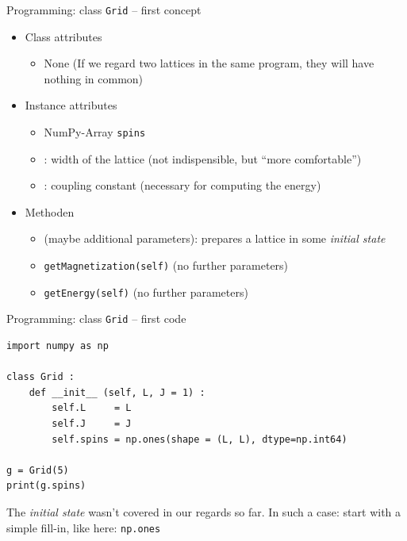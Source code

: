 
\begin{frame}[fragile]{Programming: class \texttt{Grid} -- first concept}
%
\begin{tcolorbox}[title=class \texttt{Grid}]
\begin{itemize}
\item Class attributes
	\begin{itemize}
	\item None (If we regard two lattices in the same program, they will have nothing in common)
	\end{itemize}
\item Instance attributes
	\begin{itemize}
	\item NumPy-Array \texttt{spins}
	\item {}: width of the lattice (not indispensible, but \enquote{more comfortable})
	\item {}: coupling constant (necessary for computing the energy)
	\end{itemize}
\item Methoden
	\begin{itemize}
	\item {} (maybe additional parameters): prepares a lattice in some \emph{initial state}
	\item \texttt{getMagnetization(self)} (no further parameters)
	\item \texttt{getEnergy(self)} (no further parameters)
	\end{itemize}
\end{itemize}
\end{tcolorbox}
%
\end{frame}


\begin{frame}[fragile]{Programming: class \texttt{Grid} -- first code}
%
\begin{codebox}
\begin{verbatim}
import numpy as np

class Grid :
    def __init__ (self, L, J = 1) :
        self.L     = L
        self.J     = J
        self.spins = np.ones(shape = (L, L), dtype=np.int64)

g = Grid(5)
print(g.spins)
\end{verbatim}
\end{codebox}
%
\begin{hintbox}
The \emph{initial state} wasn't covered in our regards so far. In such a case: start with a simple fill-in, like here: \texttt{np.ones}
\end{hintbox}
%
\end{frame}

